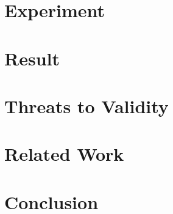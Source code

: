 \documentclass[oribibl]{llncs}
\begin{document}
\section{Experiment}
\label{sec_exp}

\section{Result}
\label{sec_result}

\section{Threats to Validity}
\label{sec_threat}

\section{Related Work}
\label{sec_related}

\section{Conclusion}
\label{sec_conclusion}

   
\end{document}

